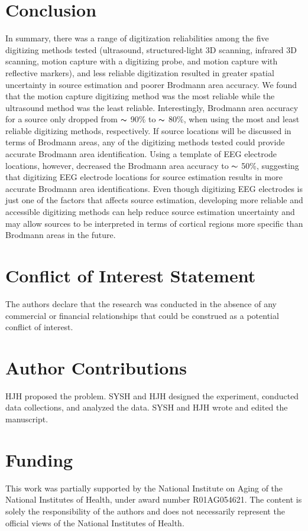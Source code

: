 \documentclass{UCF_ETD}
\begin{document}
\section{Conclusion}

In summary, there was a range of digitization reliabilities among the five digitizing methods tested (ultrasound, structured-light 3D scanning, infrared 3D scanning, motion capture with a digitizing probe, and motion capture with reflective markers), and less reliable digitization resulted in greater spatial uncertainty in source estimation and poorer Brodmann area accuracy. We found that the motion capture digitizing method was the most reliable while the ultrasound method was the least reliable. Interestingly, Brodmann area accuracy for a source only dropped from $\thicksim$ 90\% to $\thicksim$ 80\%, when using the most and least reliable digitizing methods, respectively. If source locations will be discussed in terms of Brodmann areas, any of the digitizing methods tested could provide accurate Brodmann area identification. Using a template of EEG electrode locations, however, decreased the Brodmann area accuracy to $\thicksim$ 50\%, suggesting that digitizing EEG electrode locations for source estimation results in more accurate Brodmann area identifications. Even though digitizing EEG electrodes is just one of the factors that affects source estimation, developing more reliable and accessible digitizing methods can help reduce source estimation uncertainty and may allow sources to be interpreted in terms of cortical regions more specific than Brodmann areas in the future. 

\section*{Conflict of Interest Statement}
The authors declare that the research was conducted in the absence of any commercial or financial relationships that could be construed as a potential conflict of interest.

\section*{Author Contributions}
HJH proposed the problem. SYSH and HJH designed the experiment, conducted data collections, and analyzed the data. SYSH and HJH wrote and edited the manuscript.

\section*{Funding}
This work was partially supported by the National Institute on Aging of the National Institutes of Health, under award number R01AG054621. The content is solely the responsibility of the authors and does not necessarily represent the official views of the National Institutes of Health.
\end{document}
